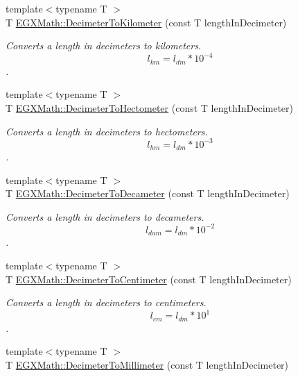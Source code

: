 \begin{DoxyCompactItemize}
{\footnotesize template$<$typename T $>$ }\\T \mbox{\hyperlink{group___e_g_x_math-_conversions-_length_conversions-_s_i-_decimeter-_s_i_gaad90a14189b6602a87b449adb1cd5e82}{E\+G\+X\+Math\+::\+Decimeter\+To\+Kilometer}} (const T length\+In\+Decimeter)
\begin{DoxyCompactList}\small\item\em Converts a length in decimeters to kilometers. \[ l_{km}=l_{dm} * 10^{-4} \]. \end{DoxyCompactList}\item 
{\footnotesize template$<$typename T $>$ }\\T \mbox{\hyperlink{group___e_g_x_math-_conversions-_length_conversions-_s_i-_decimeter-_s_i_gaa84a9ad8f41f664e41c4c390186dfa1b}{E\+G\+X\+Math\+::\+Decimeter\+To\+Hectometer}} (const T length\+In\+Decimeter)
\begin{DoxyCompactList}\small\item\em Converts a length in decimeters to hectometers. \[ l_{hm}=l_{dm} * 10^{-3} \]. \end{DoxyCompactList}\item 
{\footnotesize template$<$typename T $>$ }\\T \mbox{\hyperlink{group___e_g_x_math-_conversions-_length_conversions-_s_i-_decimeter-_s_i_ga20742de42223dbcd8af88e4e9feccfa4}{E\+G\+X\+Math\+::\+Decimeter\+To\+Decameter}} (const T length\+In\+Decimeter)
\begin{DoxyCompactList}\small\item\em Converts a length in decimeters to decameters. \[ l_{dam}=l_{dm} * 10^{-2} \]. \end{DoxyCompactList}\item 
{\footnotesize template$<$typename T $>$ }\\T \mbox{\hyperlink{group___e_g_x_math-_conversions-_length_conversions-_s_i-_decimeter-_s_i_ga032e40ec973eb890908799b87ba41710}{E\+G\+X\+Math\+::\+Decimeter\+To\+Centimeter}} (const T length\+In\+Decimeter)
\begin{DoxyCompactList}\small\item\em Converts a length in decimeters to centimeters. \[ l_{cm}=l_{dm} * 10^{1} \]. \end{DoxyCompactList}\item 
{\footnotesize template$<$typename T $>$ }\\T \mbox{\hyperlink{group___e_g_x_math-_conversions-_length_conversions-_s_i-_decimeter-_s_i_gad899e8bf5ade8cdc82e00b0fc81c2ee5}{E\+G\+X\+Math\+::\+Decimeter\+To\+Millimeter}} (const T length\+In\+Decimeter)

\end{DoxyCompactItemize}
